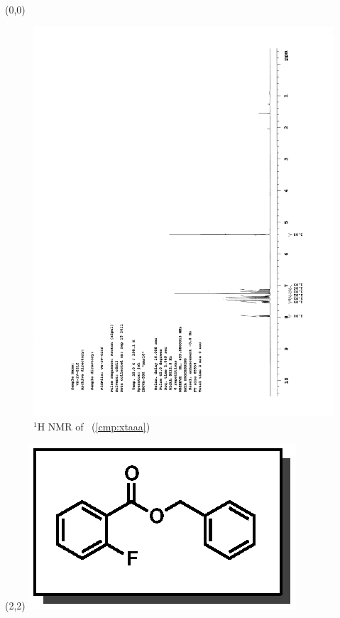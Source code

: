\begin{textblock}{20}(0,0)
\begin{figure}[htb]
\caption{$^1$H NMR of \CMPxtaaa\ (\ref{cmp:xtaaa})}
\includegraphics[scale=0.75, trim = 0mm 0mm 0mm 5mm,
clip]{chp_asymmetric/images/nmr/xtaaaH}
\vspace{-100pt}
\end{figure}
\end{textblock}
\begin{textblock}{1}(2,2)
\includegraphics[scale=0.8, angle=90]{chp_asymmetric/images/xtaaa}
\end{textblock}
